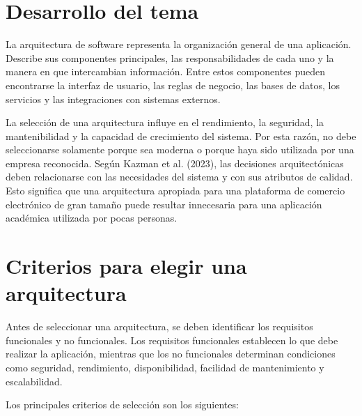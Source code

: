 \documentclass[12pt]{article}
\begin{document}
	
	\section*{Desarrollo del tema}
	
	La arquitectura de software representa la organización general de una
	aplicación. Describe sus componentes principales, las responsabilidades de
	cada uno y la manera en que intercambian información. Entre estos componentes
	pueden encontrarse la interfaz de usuario, las reglas de negocio, las bases de
	datos, los servicios y las integraciones con sistemas externos.
	
	La selección de una arquitectura influye en el rendimiento, la seguridad, la
	mantenibilidad y la capacidad de crecimiento del sistema. Por esta razón, no
	debe seleccionarse solamente porque sea moderna o porque haya sido utilizada
	por una empresa reconocida. Según Kazman et al. (2023), las decisiones
	arquitectónicas deben relacionarse con las necesidades del sistema y con sus
	atributos de calidad. Esto significa que una arquitectura apropiada para una
	plataforma de comercio electrónico de gran tamaño puede resultar innecesaria
	para una aplicación académica utilizada por pocas personas.
	
	\section*{Criterios para elegir una arquitectura}
	
	Antes de seleccionar una arquitectura, se deben identificar los requisitos
	funcionales y no funcionales. Los requisitos funcionales establecen lo que
	debe realizar la aplicación, mientras que los no funcionales determinan
	condiciones como seguridad, rendimiento, disponibilidad, facilidad de
	mantenimiento y escalabilidad.
	
	Los principales criterios de selección son los siguientes:
	
\end{document}
